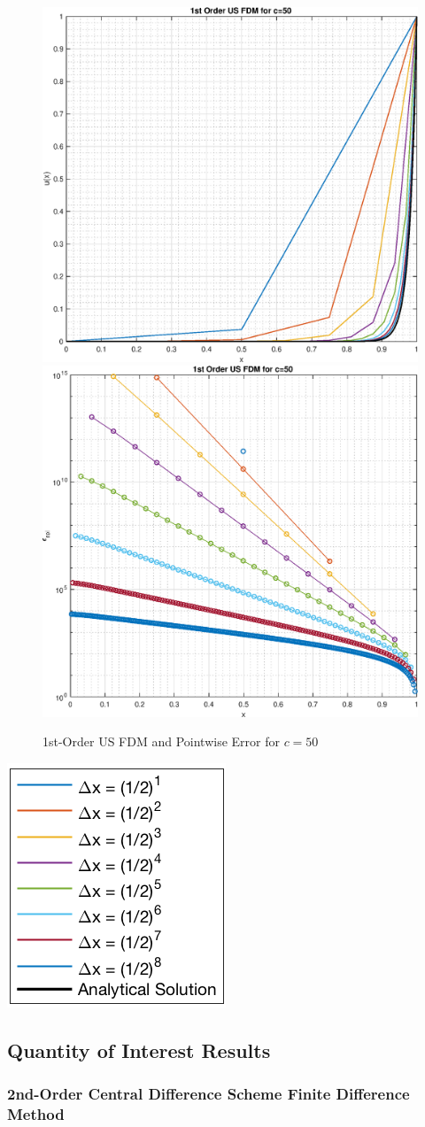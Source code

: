 \documentclass[10pt, reqno]{article}		%
\numberwithin{equation}{section}
\begin{document}
\begin{figure}[H]
	\begin{center}
		\includegraphics[width = 0.49\linewidth]{solution_1st_order_us_c_50}
		\includegraphics[width = 0.49\linewidth]{pointwise_error_1st_order_us_c_50}
		\caption{1st-Order US FDM and Pointwise Error for $c = 50$}
	\end{center}
\end{figure}

\begin{center}
	\includegraphics[height = 0.25\linewidth]{legend}
\end{center}

\newpage

\subsection{Quantity of Interest Results}

\subsubsection{2nd-Order Central Difference Scheme Finite Difference Method}
\end{document}
